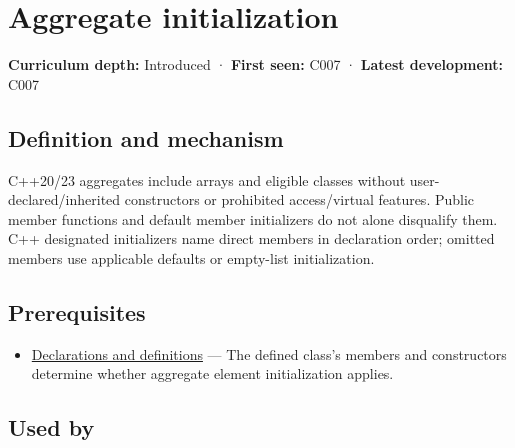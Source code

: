 \hypertarget{appendix-b7174c179542}{}\label{referencestart:appendix-b7174c179542}
\section{Aggregate initialization}\label{appendix-b7174c179542-aggregate-initialization}

\hypertarget{appendix-b7174c179542-aggregate-initialization}{}

\textbf{Curriculum depth:} Introduced · \textbf{First seen:} C007 · \textbf{Latest development:} C007

\begin{allmightroledefinition}

\subsection{Definition and mechanism}\label{appendix-b7174c179542-definition-and-mechanism}

\hypertarget{appendix-b7174c179542-definition-and-mechanism}{}

C++20/23 aggregates include arrays and eligible classes without user-declared/inherited constructors or prohibited access/virtual features. Public member functions and default member initializers do not alone disqualify them. C++ designated initializers name direct members in declaration order; omitted members use applicable defaults or empty-list initialization.

\end{allmightroledefinition}

\subsection{Prerequisites}\label{appendix-b7174c179542-prerequisites}

\hypertarget{appendix-b7174c179542-prerequisites}{}

\begin{itemize}
\tightlist
\item
  \hyperref[appendix-2e4d494c2d94]{Declarations and definitions} --- The defined class's members and constructors determine whether aggregate element initialization applies.
\end{itemize}

\subsection{Used by}\label{appendix-b7174c179542-used-by}

